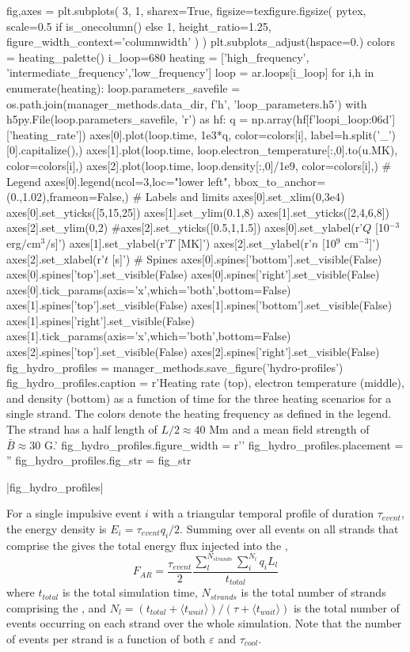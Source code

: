 \begin{pycode}
fig,axes = plt.subplots(
    3, 1, sharex=True,
    figsize=texfigure.figsize(
        pytex,
        scale=0.5 if is_onecolumn() else 1,
        height_ratio=1.25,
        figure_width_context='columnwidth'
    )
)
plt.subplots_adjust(hspace=0.)
colors = heating_palette()
i_loop=680
heating = ['high_frequency', 'intermediate_frequency','low_frequency']
loop = ar.loops[i_loop]
for i,h in enumerate(heating):
    loop.parameters_savefile = os.path.join(manager_methods.data_dir, f'{h}', 'loop_parameters.h5')
    with h5py.File(loop.parameters_savefile, 'r') as hf:
        q = np.array(hf[f'loop{i_loop:06d}']['heating_rate'])
    axes[0].plot(loop.time, 1e3*q, color=colors[i], label=h.split('_')[0].capitalize(),)
    axes[1].plot(loop.time, loop.electron_temperature[:,0].to(u.MK), color=colors[i],)
    axes[2].plot(loop.time, loop.density[:,0]/1e9, color=colors[i],)
# Legend
axes[0].legend(ncol=3,loc="lower left", bbox_to_anchor=(0.,1.02),frameon=False,)
# Labels and limits
axes[0].set_xlim(0,3e4)
axes[0].set_yticks([5,15,25])
axes[1].set_ylim(0.1,8)
axes[1].set_yticks([2,4,6,8])
axes[2].set_ylim(0,2)
#axes[2].set_yticks([0.5,1,1.5])
axes[0].set_ylabel(r'$Q$ [10$^{-3}$ erg$/$cm$^{3}$$/$s]')
axes[1].set_ylabel(r'$T$ [MK]')
axes[2].set_ylabel(r'$n$ [10$^9$ cm$^{-3}$]')
axes[2].set_xlabel(r'$t$ [s]')
# Spines
axes[0].spines['bottom'].set_visible(False)
axes[0].spines['top'].set_visible(False)
axes[0].spines['right'].set_visible(False)
axes[0].tick_params(axis='x',which='both',bottom=False)
axes[1].spines['top'].set_visible(False)
axes[1].spines['bottom'].set_visible(False)
axes[1].spines['right'].set_visible(False)
axes[1].tick_params(axis='x',which='both',bottom=False)
axes[2].spines['top'].set_visible(False)
axes[2].spines['right'].set_visible(False)
fig_hydro_profiles = manager_methods.save_figure('hydro-profiles')
fig_hydro_profiles.caption = r'Heating rate (top), electron temperature (middle), and density (bottom) as a function of time for the three heating scenarios for a single strand. The colors denote the heating frequency as defined in the legend. The strand has a half length of $L/2\approx40$ Mm and a mean field strength of $\bar{B}\approx30$ G.'
fig_hydro_profiles.figure_width = r'\columnwidth'
fig_hydro_profiles.placement = ''
fig_hydro_profiles.fig_str = fig_str
\end{pycode}
|fig_hydro_profiles|

For a single impulsive event $i$ with a triangular temporal profile of duration $\tau_{event}$, the energy density is $E_i=\tau_{event} q_i/2$. Summing over all events on all strands that comprise the \AR{} gives the total energy flux injected into the \AR{},
\begin{equation}
    F_{AR} = \frac{\tau_{event}}{2}\frac{\sum_l^{N_{strands}}\sum_i^{N_l} q_iL_l}{t_{total}}
\end{equation}
where $t_{total}$ is the total simulation time, $N_{strands}$ is the total number of strands comprising the \AR{}, and $N_l=(t_{total} + \langle t_{wait}\rangle)/(\tau + \langle t_{wait}\rangle)$ is the total number of events occurring on each strand over the whole simulation. Note that the number of events per strand is a function of both $\varepsilon$ and $\tau_{cool}$.

